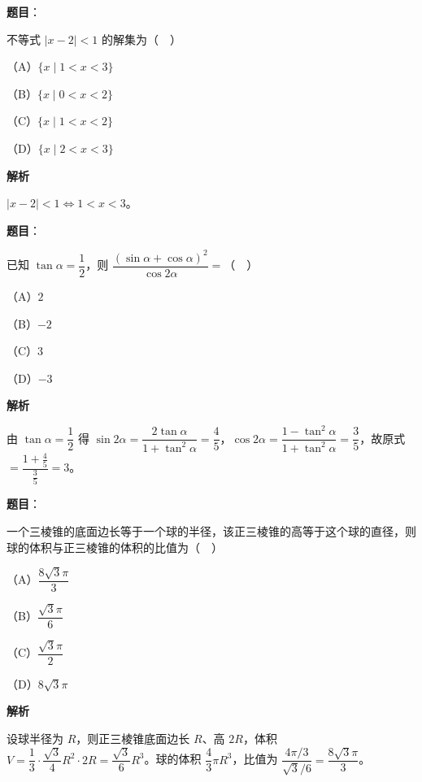 \begin{answer}

\textbf{题目}：

不等式 $|x-2|<1$ 的解集为（　）

（A）$\{x\mid 1<x<3\}$

（B）$\{x\mid 0<x<2\}$

（C）$\{x\mid 1<x<2\}$

（D）$\{x\mid 2<x<3\}$

\textbf{解析}

$|x-2|<1\iff1<x<3$。


\end{answer}
\begin{answer}

\textbf{题目}：

已知 $\tan\alpha=\dfrac12$，则 $\dfrac{(\sin\alpha+\cos\alpha)^2}{\cos2\alpha}=$（　）

（A）$2$

（B）$-2$

（C）$3$

（D）$-3$

\textbf{解析}

由 $\tan\alpha=\dfrac12$ 得 $\sin2\alpha=\dfrac{2\tan\alpha}{1+\tan^2\alpha}=\dfrac45$，$\cos2\alpha=\dfrac{1-\tan^2\alpha}{1+\tan^2\alpha}=\dfrac35$，故原式 $=\dfrac{1+\frac45}{\frac35}=3$。


\end{answer}
\begin{answer}

\textbf{题目}：

一个三棱锥的底面边长等于一个球的半径，该正三棱锥的高等于这个球的直径，则球的体积与正三棱锥的体积的比值为（　）

（A）$\dfrac{8\sqrt3\pi}3$

（B）$\dfrac{\sqrt3\pi}6$

（C）$\dfrac{\sqrt3\pi}2$

（D）$8\sqrt3\pi$

\textbf{解析}

设球半径为 $R$，则正三棱锥底面边长 $R$、高 $2R$，体积 $V=\dfrac13\cdot\dfrac{\sqrt3}4R^2\cdot2R=\dfrac{\sqrt3}6R^3$。球的体积 $\dfrac43\pi R^3$，比值为 $\dfrac{4\pi/3}{\sqrt3/6}=\dfrac{8\sqrt3\pi}3$。


\end{answer}
